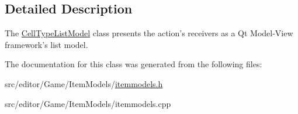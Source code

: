 \subsection{\-Detailed \-Description}
\-The \hyperlink{class_cell_type_list_model}{\-Cell\-Type\-List\-Model} class presents the action's receivers as a \-Qt \-Model-\/\-View framework's list model. 

\-The documentation for this class was generated from the following files\-:\begin{DoxyCompactItemize}
\item 
src/editor/\-Game/\-Item\-Models/\hyperlink{itemmodels_8h}{itemmodels.\-h}\item 
src/editor/\-Game/\-Item\-Models/itemmodels.\-cpp\end{DoxyCompactItemize}
